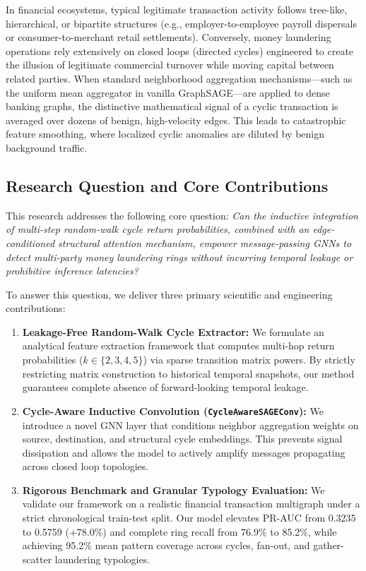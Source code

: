 \documentclass[10pt,twocolumn]{article}
\begin{document}
In financial ecosystems, typical legitimate transaction activity follows tree-like, hierarchical, or bipartite structures (e.g., employer-to-employee payroll dispersals or consumer-to-merchant retail settlements). Conversely, money laundering operations rely extensively on closed loops (directed cycles) engineered to create the illusion of legitimate commercial turnover while moving capital between related parties. When standard neighborhood aggregation mechanisms—such as the uniform mean aggregator in vanilla GraphSAGE—are applied to dense banking graphs, the distinctive mathematical signal of a cyclic transaction is averaged over dozens of benign, high-velocity edges. This leads to catastrophic feature smoothing, where localized cyclic anomalies are diluted by benign background traffic.

\subsection{Research Question and Core Contributions}
This research addresses the following core question: \textit{Can the inductive integration of multi-step random-walk cycle return probabilities, combined with an edge-conditioned structural attention mechanism, empower message-passing GNNs to detect multi-party money laundering rings without incurring temporal leakage or prohibitive inference latencies?}

To answer this question, we deliver three primary scientific and engineering contributions:
\begin{enumerate}
    \item \textbf{Leakage-Free Random-Walk Cycle Extractor:} We formulate an analytical feature extraction framework that computes multi-hop return probabilities ($k \in \{2, 3, 4, 5\}$) via sparse transition matrix powers. By strictly restricting matrix construction to historical temporal snapshots, our method guarantees complete absence of forward-looking temporal leakage.
    \item \textbf{Cycle-Aware Inductive Convolution (\texttt{CycleAwareSAGEConv}):} We introduce a novel GNN layer that conditions neighbor aggregation weights on source, destination, and structural cycle embeddings. This prevents signal dissipation and allows the model to actively amplify messages propagating across closed loop topologies.
    \item \textbf{Rigorous Benchmark and Granular Typology Evaluation:} We validate our framework on a realistic financial transaction multigraph under a strict chronological train-test split. Our model elevates PR-AUC from 0.3235 to 0.5759 (+78.0\%) and complete ring recall from 76.9\% to 85.2\%, while achieving 95.2\% mean pattern coverage across cycles, fan-out, and gather-scatter laundering typologies.
\end{enumerate}
\end{document}
